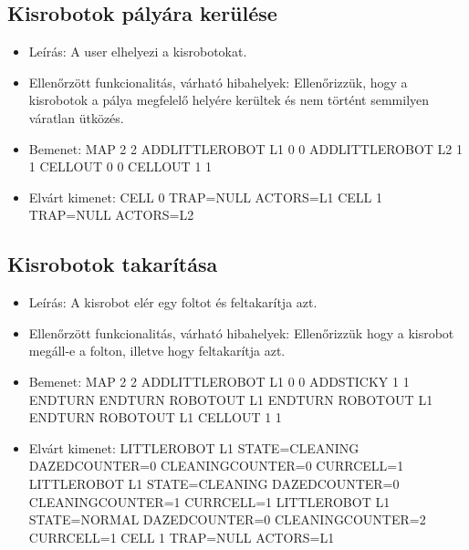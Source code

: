 \subsection{Kisrobotok pályára kerülése}
\begin{itemize}
\item Leírás: \newline
A user elhelyezi a kisrobotokat.
\item Ellenőrzött funkcionalitás, várható hibahelyek: \newline
Ellenőrizzük, hogy a kisrobotok a pálya megfelelő helyére kerültek és nem történt semmilyen váratlan ütközés.
\item Bemenet: \newline
MAP 2 2
ADDLITTLEROBOT L1 0 0
ADDLITTLEROBOT L2 1 1
CELLOUT 0 0
CELLOUT 1 1
\item Elvárt kimenet: \newline
CELL 0 TRAP=NULL ACTORS=L1
CELL 1 TRAP=NULL ACTORS=L2
\end{itemize}

\subsection{Kisrobotok takarítása}
\begin{itemize}
	\item Leírás: \newline
	A kisrobot elér egy foltot és feltakarítja azt. \newline
	\item Ellenőrzött funkcionalitás, várható hibahelyek: \newline
	Ellenőrizzük hogy a kisrobot megáll-e a folton, illetve hogy feltakarítja azt. \newline
	\item Bemenet: \newline
	MAP 2 2 \newline
	ADDLITTLEROBOT L1 0 0 \newline
	ADDSTICKY 1 1 \newline
	ENDTURN \newline
	ENDTURN \newline
	ROBOTOUT L1 \newline
	ENDTURN \newline
	ROBOTOUT L1 \newline
	ENDTURN \newline
	ROBOTOUT L1 \newline
	CELLOUT 1 1 \newline
	\item Elvárt kimenet: \newline
	LITTLEROBOT L1 STATE=CLEANING DAZEDCOUNTER=0 CLEANINGCOUNTER=0 CURRCELL=1
	LITTLEROBOT L1 STATE=CLEANING DAZEDCOUNTER=0 CLEANINGCOUNTER=1 CURRCELL=1
	LITTLEROBOT L1 STATE=NORMAL DAZEDCOUNTER=0 CLEANINGCOUNTER=2 CURRCELL=1
	CELL 1 TRAP=NULL ACTORS=L1

\end{itemize}

